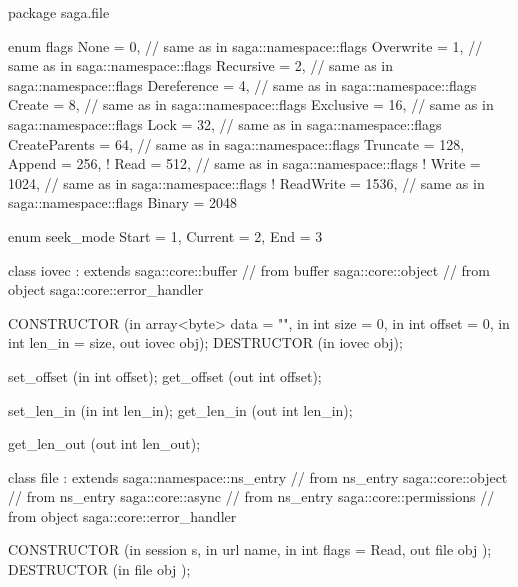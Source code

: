  \begin{myspec}
  package saga.file 
  { 
    enum flags 
    { 
      None           =    0, // same as in saga::namespace::flags 
      Overwrite      =    1, // same as in saga::namespace::flags
      Recursive      =    2, // same as in saga::namespace::flags 
      Dereference    =    4, // same as in saga::namespace::flags 
      Create         =    8, // same as in saga::namespace::flags 
      Exclusive      =   16, // same as in saga::namespace::flags
      Lock           =   32, // same as in saga::namespace::flags 
      CreateParents  =   64, // same as in saga::namespace::flags 
      Truncate       =  128, 
      Append         =  256, 
!     Read           =  512, // same as in saga::namespace::flags 
!     Write          = 1024, // same as in saga::namespace::flags 
!     ReadWrite      = 1536, // same as in saga::namespace::flags 
      Binary         = 2048 
    }
 
 
    enum seek_mode
    {
      Start      =   1,
      Current    =   2,
      End        =   3
    }
 
 
    class iovec : extends     saga::core::buffer
               // from buffer saga::core::object
               // from object saga::core::error_handler
    {
      CONSTRUCTOR (in array<byte>          data   = "",
                   in    int               size   = 0,
                   in    int               offset = 0,
                   in    int               len_in = size,
                   out   iovec             obj);
      DESTRUCTOR  (in    iovec             obj);
 
      set_offset  (in    int               offset);
      get_offset  (out   int               offset);
 
      set_len_in  (in    int               len_in);
      get_len_in  (out   int               len_in);
 
      get_len_out (out   int               len_out);
    }
 
    class file : extends        saga::namespace::ns_entry
              // from ns_entry  saga::core::object
              // from ns_entry  saga::core::async
              // from ns_entry  saga::core::permissions
              // from object    saga::core::error_handler
    {
      CONSTRUCTOR (in    session           s,
                   in    url               name,
                   in    int               flags = Read,
                   out   file              obj      );
      DESTRUCTOR  (in    file              obj      );
 
}}
\end{myspec}
